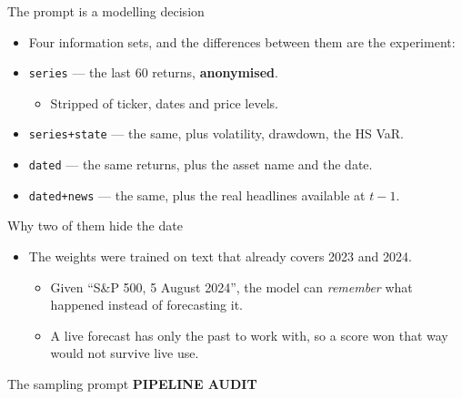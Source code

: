 \documentclass[9pt, aspectratio=169, t]{beamer}
\begin{document}
\begin{frame}{The prompt is a modelling decision}
  \begin{itemize}
    \item Four information sets, and the differences between them are the experiment:
  \end{itemize}
  \begin{itemize}
    \item \texttt{series} --- the last 60 returns, \textbf{anonymised}.
      \begin{itemize}
        \item Stripped of ticker, dates and price levels.
      \end{itemize}
    \item \texttt{series+state} --- the same, plus volatility, drawdown, the HS VaR.
    \item \texttt{dated} --- the same returns, plus the asset name and the date.
    \item \texttt{dated+news} --- the same, plus the real headlines available at $t-1$.
  \end{itemize}
  \vspace{0.5em}
  \begin{alertblock}{Why two of them hide the date}
    \begin{itemize}
      \item The weights were trained on text that already covers 2023 and 2024.
        \begin{itemize}
          \item Given ``S\&P 500, 5 August 2024'', the model can \emph{remember} what
                happened instead of forecasting it.
          \item A live forecast has only the past to work with, so a score won that way
                would not survive live use.
        \end{itemize}
    \end{itemize}
  \end{alertblock}
\end{frame}

\begin{frame}{The sampling prompt}
  \hfill\textcolor{MainBlue}{\scriptsize\textbf{PIPELINE AUDIT}}\par\vspace{-0.3em}

  \vspace{-0.4em}
  
  \vspace{-0.75em}

  

\end{frame}
\end{document}
